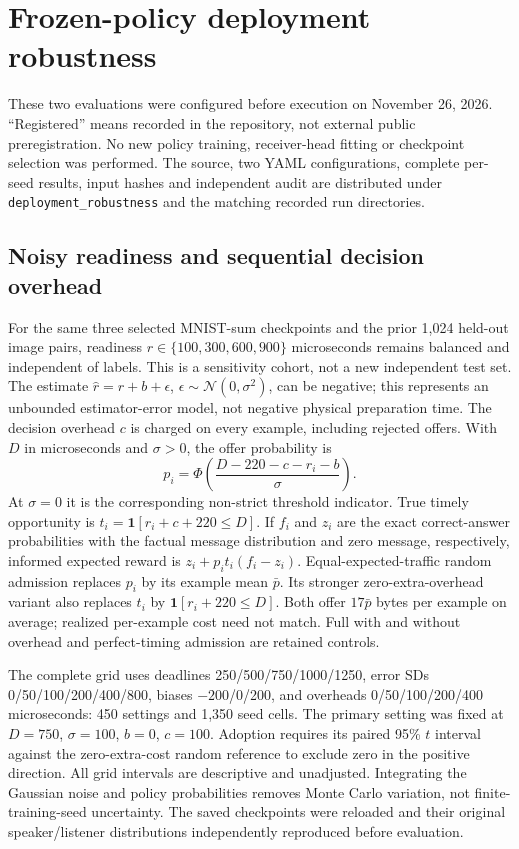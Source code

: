 \documentclass[pdflatex,sn-mathphys-num]{sn-jnl}
\begin{document}
\FloatBarrier
\section{Frozen-policy deployment robustness}\label{app:deployment_robustness}
These two evaluations were configured before execution on November 26, 2026. ``Registered'' means recorded in the repository, not external public preregistration. No new policy training, receiver-head fitting or checkpoint selection was performed. The source, two YAML configurations, complete per-seed results, input hashes and independent audit are distributed under \texttt{deployment\_robustness} and the matching recorded run directories.

\subsection{Noisy readiness and sequential decision overhead}
For the same three selected MNIST-sum checkpoints and the prior 1,024 held-out image pairs, readiness $r\in\{100,300,600,900\}$ microseconds remains balanced and independent of labels. This is a sensitivity cohort, not a new independent test set. The estimate $\hat r=r+b+\epsilon$, $\epsilon\sim\mathcal{N}(0,\sigma^2)$, can be negative; this represents an unbounded estimator-error model, not negative physical preparation time. The decision overhead $c$ is charged on every example, including rejected offers. With $D$ in microseconds and $\sigma>0$, the offer probability is
\begin{equation}
 p_i=\Phi\!\left(\frac{D-220-c-r_i-b}{\sigma}\right).
\end{equation}
At $\sigma=0$ it is the corresponding non-strict threshold indicator. True timely opportunity is $t_i=\mathbf{1}[r_i+c+220\leq D]$. If $f_i$ and $z_i$ are the exact correct-answer probabilities with the factual message distribution and zero message, respectively, informed expected reward is $z_i+p_it_i(f_i-z_i)$. Equal-expected-traffic random admission replaces $p_i$ by its example mean $\bar p$. Its stronger zero-extra-overhead variant also replaces $t_i$ by $\mathbf{1}[r_i+220\leq D]$. Both offer $17\bar p$ bytes per example on average; realized per-example cost need not match. Full with and without overhead and perfect-timing admission are retained controls.

The complete grid uses deadlines 250/500/750/1000/1250, error SDs 0/50/100/200/400/800, biases $-200$/0/200, and overheads 0/50/100/200/400 microseconds: 450 settings and 1,350 seed cells. The primary setting was fixed at $D=750$, $\sigma=100$, $b=0$, $c=100$. Adoption requires its paired 95\% $t$ interval against the zero-extra-cost random reference to exclude zero in the positive direction. All grid intervals are descriptive and unadjusted. Integrating the Gaussian noise and policy probabilities removes Monte Carlo variation, not finite-training-seed uncertainty. The saved checkpoints were reloaded and their original speaker/listener distributions independently reproduced before evaluation.
\end{document}
